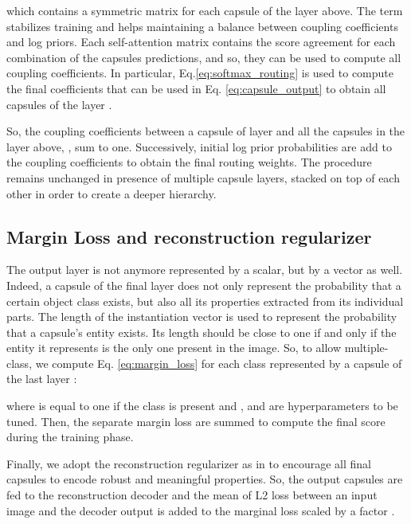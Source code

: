 \documentclass{article}
\begin{document}
\begin{ceqn}

\end{ceqn}
which contains a symmetric matrix  for each capsule  of the layer above. The term  stabilizes training and helps maintaining a balance between coupling coefficients and log priors. Each self-attention matrix contains the score agreement for each combination of the  capsules predictions, and so, they can be used to compute all coupling coefficients. In particular, Eq.\ref{eq:softmax_routing} is used to compute the final coefficients that can be used in Eq. \ref{eq:capsule_output} to obtain all capsules  of the layer .
\begin{ceqn}

\end{ceqn}
So, the coupling coefficients between a capsule of layer  and all the capsules in the layer above, , sum to one. Successively, initial log prior probabilities are add to the coupling coefficients to obtain the final routing weights. The procedure remains unchanged in presence of multiple capsule layers, stacked on top of each other in order to create a deeper hierarchy. 
\subsection{Margin Loss and reconstruction regularizer}
The output layer is not anymore represented by a scalar, but by a vector as well. Indeed, a capsule of the final layer does not only represent the probability that a certain object class exists, but also all its properties extracted from its individual parts. The length of the instantiation vector is used to represent the probability that a capsule's entity exists. Its length should be close to one if and only if the entity it represents is the only one present in the image. So, to allow multiple-class, we compute Eq. \ref{eq:margin_loss} for each class represented by a capsule  of the last layer :
\begin{ceqn}

\end{ceqn}
where  is equal to one if the class  is present and ,  and  are hyperparameters to be tuned. Then, the separate margin loss  are summed to compute the final score during the training phase.

Finally, we adopt the reconstruction regularizer as in\cite{sabour2017dynamic} to encourage all final capsules to encode robust and meaningful properties. So, the output capsules  are fed to the reconstruction decoder and the mean of L2 loss between an input image and the decoder output is added to the marginal loss scaled by a factor .  
\end{document}
